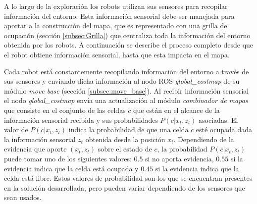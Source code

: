 A lo largo de la exploración los robots utilizan sus sensores para recopilar
información del entorno. Esta información sensorial debe ser manejada para
aportar a la construcción del mapa, que es representado con una grilla de
ocupación (sección \ref{subsec:Grilla}) que centraliza toda la información del
entorno obtenida por los robots. A continuación se describe el proceso completo
desde que el robot obtiene información sensorial, hasta que esta impacta en el
mapa.


Cada robot está constantemente recopilando información del entorno a través de
sus sensores y enviando dicha información al nodo \gls{ROS}
\emph{global\_costmap} de su módulo \emph{move base} (sección
\ref{subsec:move_base}). Al recibir información sensorial el nodo
\emph{global\_costmap} envía una actualización al módulo \emph{combinador de
mapas} que consiste en el conjunto de las celdas $c$ que están en el alcance de
la información sensorial recibida y sus probabilidades $P(c | x_t,z_t)$ asociadas. El
valor de $P(c|x_t,z_t)$ indica la probabilidad de que una celda
$c$ esté ocupada dada la información sensorial $z_t$ obtenida desde la posición
$x_t$. Dependiendo de la evidencia que aporte $(x_t,z_t)$ sobre el estado de
$c$, la probabilidad $P(c|x_t,z_t)$ puede tomar uno de los siguientes
valores: $0.5$ si no aporta evidencia, $0.55$ si la evidencia indica que la
celda está ocupada y $0.45$ si la evidencia indica que la celda está libre.
Estos valores de probabilidad son los que se encuentran presentes en la
solución desarrollada, pero pueden variar dependiendo de los sensores que sean
usados. 




